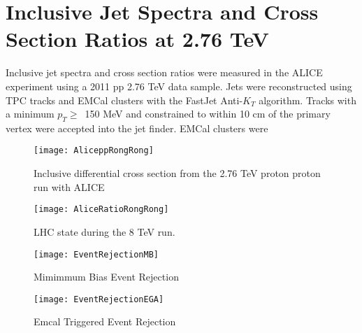 \section{Inclusive Jet Spectra and Cross Section Ratios at 2.76 TeV}
Inclusive jet spectra and cross section ratios were measured in the ALICE experiment using a 2011 pp 2.76 TeV data sample\cite{MA2013319}.  Jets were reconstructed using TPC tracks and EMCal clusters with the FastJet Anti-$K_{T}$ algorithm.  Tracks with a minimum $p_{T} \geq \,$ 150 MeV and constrained to within 10 cm of the primary vertex were accepted into the jet finder.  EMCal clusters were 

\begin{figure}[h]
\texttt{[image: AliceppRongRong]}
\centering
\caption{Inclusive differential cross section from the 2.76 TeV proton proton run with ALICE}
\label{fig:RunEff}
\end{figure}

\begin{figure}[h]
\texttt{[image: AliceRatioRongRong]}
\centering
\caption{LHC state during the 8 TeV run. }
\label{fig:RunEff}
\end{figure}

\begin{figure}[!tbp]
  \centering
  \begin{minipage}[b]{0.4\textwidth}
    \texttt{[image: EventRejectionMB]}
    \caption{Mimimmum Bias Event Rejection}
  \end{minipage}
  \hfill
  \begin{minipage}[b]{0.49\textwidth}
    \texttt{[image: EventRejectionEGA]}
    \caption{Emcal Triggered Event Rejection}
  \end{minipage}
\end{figure}